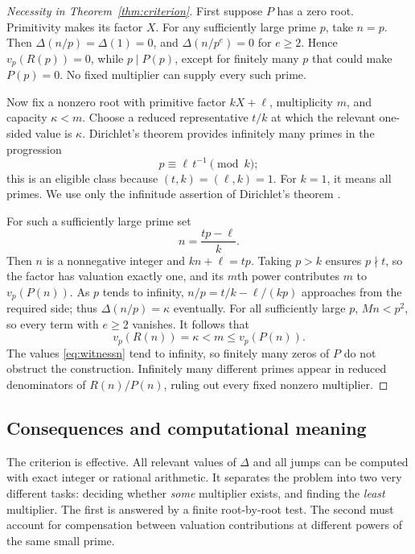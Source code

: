 \documentclass[11pt]{article}
\theoremstyle{definition}
\theoremstyle{remark}
\newcommand{\vp}{v_p}
\begin{document}
\begin{proof}[Necessity in Theorem~\ref{thm:criterion}]
First suppose $P$ has a zero root. Primitivity makes its factor $X$.
For any sufficiently large prime $p$, take $n=p$. Then
$\Delta(n/p)=\Delta(1)=0$, and $\Delta(n/p^e)=0$ for $e\geq2$.
Hence $\vp(R(p))=0$, while $p\mid P(p)$, except for finitely many
$p$ that could make $P(p)=0$. No fixed multiplier can supply every
such prime.

Now fix a nonzero root with primitive factor $kX+\ell$, multiplicity
$m$, and capacity $\kappa<m$. Choose a reduced representative $t/k$
at which the relevant one-sided value is $\kappa$. Dirichlet's theorem
provides infinitely many primes in the progression
\begin{equation}\label{eq:dirichletclass}
 p\equiv \ell\,t^{-1}\pmod k;
\end{equation}
this is an eligible class because $(t,k)=(\ell,k)=1$. For $k=1$, it
means all primes. We use only the infinitude assertion of Dirichlet's
theorem \cite[Theorem 4.2]{kedlaya}.

For such a sufficiently large prime set
\begin{equation}\label{eq:witnessn}
 n=\frac{tp-\ell}{k}.
\end{equation}
Then $n$ is a nonnegative integer and $kn+\ell=tp$. Taking $p>k$
ensures $p\nmid t$, so the factor has valuation exactly one, and its
$m$th power contributes $m$ to $\vp(P(n))$. As $p$ tends to infinity,
$n/p=t/k-\ell/(kp)$ approaches from the required side; thus
$\Delta(n/p)=\kappa$ eventually. For all sufficiently large $p$,
$Mn<p^2$, so every term with $e\geq2$ vanishes. It follows that
\[
 \vp(R(n))=\kappa<m\leq\vp(P(n)).
\]
The values \eqref{eq:witnessn} tend to infinity, so finitely many zeros
of $P$ do not obstruct the construction. Infinitely many different
primes appear in reduced denominators of $R(n)/P(n)$, ruling out every
fixed nonzero multiplier.
\end{proof}

\subsection{Consequences and computational meaning}
The criterion is effective. All relevant values of $\Delta$ and all
jumps can be computed with exact integer or rational arithmetic. It
separates the problem into two very different tasks: deciding whether
\emph{some} multiplier exists, and finding the \emph{least} multiplier.
The first is answered by a finite root-by-root test. The second must
account for compensation between valuation contributions at different
powers of the same small prime.
\end{document}
